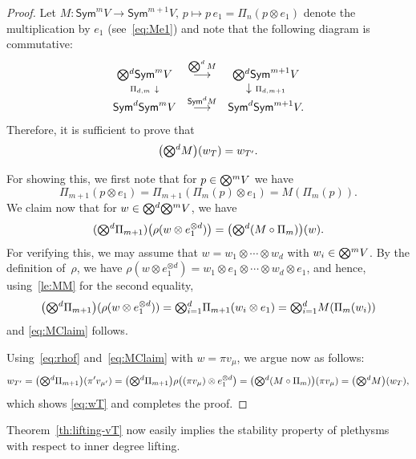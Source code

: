 \documentclass[11pt]{amsart}
\def\Sym{\mathsf{Sym}}
\def\ot{\otimes}
\newcommand{\tensor}{\smash{\textstyle\bigotimes}}
\numberwithin{equation}{section}
\begin{document}
\begin{proof}
Let $M\colon\Sym^m V \to \Sym^{m+1} V,\, p \mapsto p\, e_1 = \Pi_{n}(p \ot e_1)$ 
denote the multiplication by $e_1$ (see~\eqref{eq:Me1})
and note that the following diagram is commutative: 
$$
\begin{array}{cccc}
\tensor^d\Sym^m V & \stackrel{\bigotimes^d M}{\longrightarrow} & \tensor^d\Sym^{m+1} V \\
  \scriptstyle{\Pi_{d,m}}\ \downarrow  &                   & \downarrow\ \scriptstyle{\Pi_{d,m+1}}   \\
\Sym^d\Sym^m V & \stackrel{\Sym^d M}{\longrightarrow} & \Sym^d\Sym^{m+1} V .
\end{array}
$$
Therefore, it is sufficient to prove that 
\begin{equation}\label{eq:wT}
 \big(\tensor^d M\big) (w_T) = w_{T'} .
\end{equation}

For showing this,
we first note that for $p\in\tensor^m V$ we have 
\begin{equation}\label{le:MM}
 \Pi_{m+1}(p \ot e_1) = \Pi_{m+1}(\Pi_m(p) \ot e_1) = M (\Pi_m(p)) .
\end{equation}
We claim now that for $w\in\tensor^d\tensor^m V$, we have
\begin{equation}\label{eq:MClaim}
 (\tensor^d \Pi_{m+1}) \big(\rho ( w \ot e_1^{\ot d}) \big) = \big(\tensor^d (M\circ \Pi_m)\big) (w) .
\end{equation}
For verifying this, we may assume that 
$w=w_1\ot\cdots\ot w_d$ with $w_i\in\tensor^m V$. 
By the definition of~$\rho$, we have 
$\rho(w \ot e_1^{\ot d}) = w_1\ot e_1 \ot \cdots\ot w_d\ot e_1$,  
and hence, using~\eqref{le:MM} for the second equality, 
$$
 \big(\tensor^d\Pi_{m+1}\big) (\rho (w\ot e_1^{\otimes d})) = \tensor_{i=1}^d \Pi_{m+1} (w_i\ot e_1)
 = \tensor_{i=1}^d M (\Pi_m(w_i)) %
$$
and \eqref{eq:MClaim} follows.

Using~\eqref{eq:rhof} and~\eqref{eq:MClaim} with $w=\pi v_\mu$, 
we argue now as follows:  
$$
 w_{T'} = \big(\tensor^d \Pi_{m+1} \big) (\pi' v_{\mu'}) =
 \big(\tensor^d \Pi_{m+1} \big) \rho \big( (\pi v_\mu) \ot e_1^{\ot d} \big) = 
 \big(\tensor^d (M\circ \Pi_m)\big)(\pi v_\mu) = 
 \big(\tensor^d M\big)(w_T) ,
$$
which shows \eqref{eq:wT} and completes the proof. 
\end{proof}

Theorem~\ref{th:lifting-vT} now easily implies the stability property of plethysms 
with respect to inner degree lifting. 
\end{document}
